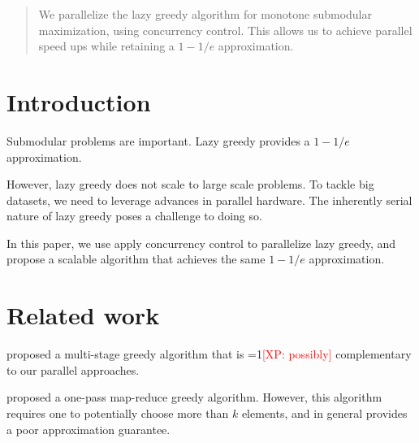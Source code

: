 \documentclass{article}
\newcommand{\Comments}{1}
\newcommand{\note}[2]{\ifnum\Comments=1\textcolor{#1}{#2}\fi}
\newcommand{\xinghao}[1]{\note{red}{[XP: #1]}}
\begin{document}
 


\begin{abstract} 
We parallelize the lazy greedy algorithm for monotone submodular maximization, using concurrency control.
This allows us to achieve parallel speed ups while retaining a $1-1/e$ approximation.
\end{abstract} 

\section{Introduction}
\label{sec:intro}
Submodular problems are important.
Lazy greedy provides a $1-1/e$ approximation.

However, lazy greedy does not scale to large scale problems.
To tackle big datasets, we need to leverage advances in parallel hardware.
The inherently serial nature of lazy greedy poses a challenge to doing so.

In this paper, we use apply concurrency control to parallelize lazy greedy, and propose a scalable algorithm that achieves the same $1-1/e$ approximation.

\section{Related work}
\label{sec:relatedwork}
\citet{wei14} proposed a multi-stage greedy algorithm that is \xinghao{possibly} complementary to our parallel approaches.

\citet{Mirzasoleiman2013} proposed a one-pass map-reduce greedy algorithm.
However, this algorithm requires one to potentially choose more than $k$ elements, and in general provides a poor approximation guarantee.
\end{document}

